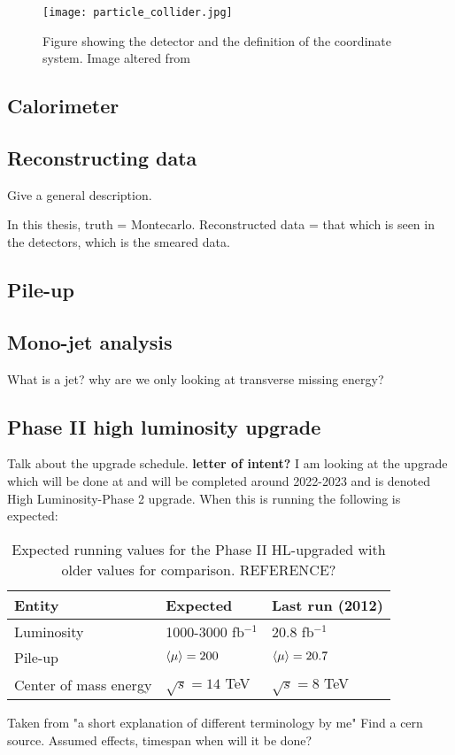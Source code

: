 \begin{figure}[ht]
\begin{center}
\texttt{[image: particle\_collider.jpg]}
\caption{Figure showing the \abbrATLAS detector and the definition of the coordinate system. Image altered from\citep{coordimage}}
\label{fig:coordinatesystem}
\end{center}
\end{figure}

\subsection{Calorimeter}
\subsection{Reconstructing data}
Give a general description.

In this thesis, truth = Montecarlo. 
Reconstructed data = that which is seen in the detectors, which is the smeared data.
\subsection{Pile-up}\label{sec:experiment:subsec:pileup}
\subsection{Mono-jet analysis}\label{sec:experiment:subsec:monojet}
What is a jet? why are we only looking at transverse missing energy? 

\subsection{Phase II high luminosity upgrade}
Talk about the upgrade schedule. \textbf{letter of intent?}
I am looking at the upgrade which will be done at \abbrCERN and will be completed around 2022-2023 and is denoted High Luminosity-\abbrLHC Phase 2 upgrade. When this is running the following is expected:
\begin{table}[H]
\begin{center}
    \begin{tabular}{ | l | l | l |}
    \hline
    Entity & Expected & Last run (2012) \\ \hline
  	Luminosity & 1000-3000 fb$^{-1}$ & 20.8 fb$^{-1}$ \\ \hline
  	Pile-up & $\left<\mu\right>=200$ & $\left<\mu\right>=20.7$ \\ \hline
  	Center of mass energy & $\sqrt{s}=14$ TeV &  $\sqrt{s}=8$ TeV \\ \hline
  	\end{tabular}
  	
  	\caption{Expected running values for the Phase II HL-upgraded \abbrLHC with older values for comparison. REFERENCE?}
  	\label{tab:expectvalues}
  	\end{center}
    \end{table}
Taken from "a short explanation of different terminology by me" Find a cern source.
Assumed effects, timespan when will it be done?

